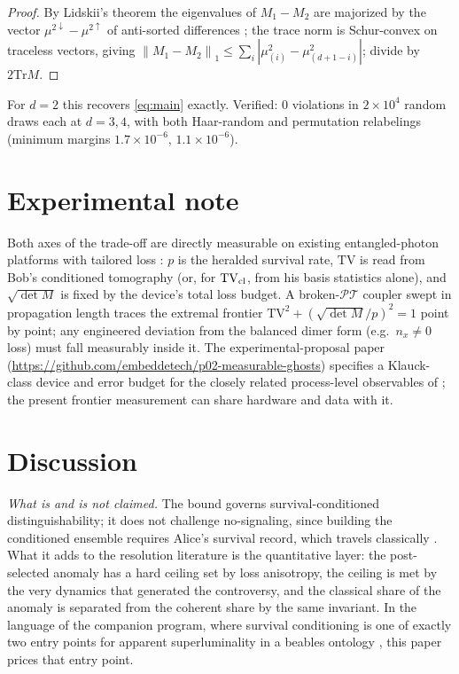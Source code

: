 \documentclass[11pt]{article}
\theoremstyle{remark}
\newcommand{\PT}{\mathcal{PT}}
\newcommand{\TV}{\mathrm{TV}}
\newcommand{\Tr}{\mathrm{Tr}}
\newcommand{\norm}[1]{\left\lVert #1 \right\rVert}
\begin{document}
\begin{proof}
By Lidskii's theorem the eigenvalues of $M_1-M_2$ are majorized by
the vector $\mu^{2\downarrow}-\mu^{2\uparrow}$ of anti-sorted
differences \cite{Bhatia}; the trace norm is Schur-convex on
traceless vectors, giving
$\norm{M_1-M_2}_1\le\sum_i|\mu^{2}_{(i)}-\mu^{2}_{(d+1-i)}|$; divide
by $2\Tr M$.
\end{proof}

For $d=2$ this recovers \eqref{eq:main} exactly. Verified: $0$
violations in $2\times10^{4}$ random draws each at $d=3,4$, with
both Haar-random and permutation relabelings (minimum margins
$1.7\times10^{-6}$, $1.1\times10^{-6}$).

\section{Experimental note}
\label{sec:experiment}

Both axes of the trade-off are directly measurable on existing
entangled-photon platforms with tailored loss
\cite{Tang2016,Ehrhardt2022}: $p$ is the heralded survival rate,
$\TV$ is read from Bob's conditioned tomography (or, for
$\TV_{\rm cl}$, from his basis statistics alone), and
$\sqrt{\det M}$ is fixed by the device's total loss budget. A
broken-$\PT$ coupler swept in propagation length traces the extremal
frontier $\TV^{2}+(\sqrt{\det M}/p)^{2}=1$ point by point;
any engineered deviation from the balanced dimer form (e.g.\
$n_x\neq0$ loss) must fall measurably inside it. The experimental-proposal paper
(\url{https://github.com/embeddetech/p02-measurable-ghosts})
specifies a Klauck-class device and error budget for
the closely related process-level observables of \cite{indivisible};
the present frontier measurement can share hardware and data with
it.

\section{Discussion}
\label{sec:discussion}

\emph{What is and is not claimed.} The bound governs
survival-conditioned distinguishability; it does not challenge
no-signaling, since building the conditioned ensemble requires
Alice's survival record, which travels classically
\cite{Tang2016,Ju2019,instantaneous}. What it adds to the resolution
literature is the quantitative layer: the post-selected anomaly has
a hard ceiling set by loss anisotropy, the ceiling is met by the
very dynamics that generated the controversy, and the classical
share of the anomaly is separated from the coherent share by the
same invariant. In the language of the companion program, where
survival conditioning is one of exactly two entry points for
apparent superluminality in a beables ontology \cite{instantaneous},
this paper prices that entry point.
\end{document}
